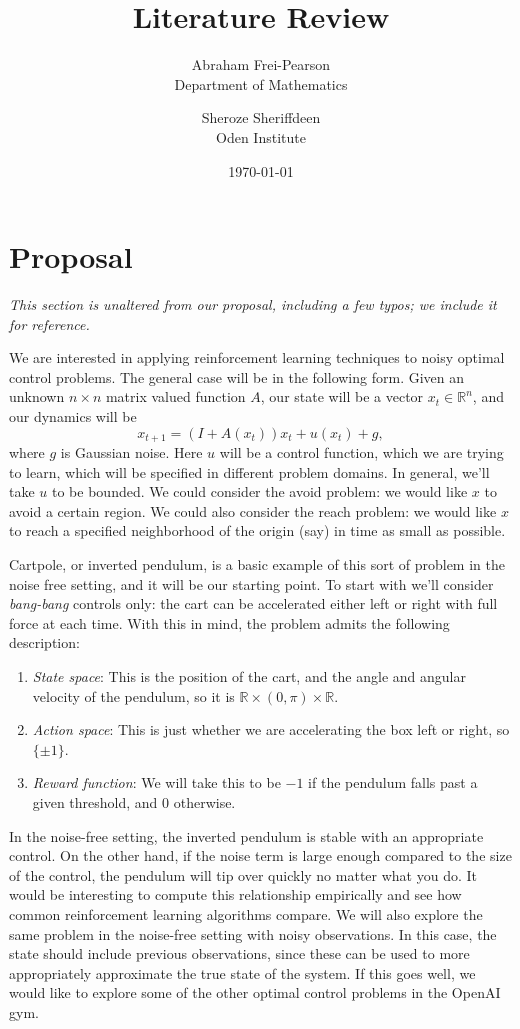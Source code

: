 \documentclass{article}
\title{Literature Review}
\author{Abraham Frei-Pearson \\
	Department of Mathematics  \\
	\and 
	Sheroze Sheriffdeen \\
	Oden Institute \\
	}
\date{\today}
\begin{document}
\maketitle

\section{Proposal}

{\em This section is unaltered from our proposal, including a few typos; we include it for reference.}

We are interested in applying reinforcement learning techniques to noisy optimal control problems. The general case will be in the following form. Given an unknown $n \times n$ matrix valued function $A$, our state will be a vector $x_t \in \mathbb R^n$, and our dynamics will be
\[
    x_{t+1} = (I + A(x_t)) x_t + u(x_t) + g,
\]
where $g$ is Gaussian noise. Here $u$ will be a control function, which we are trying to learn, which will be specified in different problem domains. In general, we'll take $u$ to be bounded. We could consider the avoid problem: we would like $x$ to avoid a certain region. We could also consider the reach problem: we would like $x$ to reach a specified neighborhood of the origin (say) in time as small as possible.

Cartpole, or inverted pendulum, is a basic example of this sort of problem in the noise free setting, and it will be our starting point. To start with we'll consider {\em bang-bang} controls only: the cart can be accelerated either left or right with full force at each time. With this in mind, the problem admits the following description:
\begin{enumerate}
    \item []{\em State space}: This is the position of the cart, and the angle and angular velocity of the pendulum, so it is $\mathbb R \times (0,\pi) \times \mathbb R$.
    \item []{\em Action space}: This is just whether we are accelerating the box left or right, so $\{\pm 1\}$.
    \item []{\em Reward function}: We will take this to be $-1$ if the pendulum falls past a given threshold, and $0$ otherwise.
\end{enumerate}

In the noise-free setting, the inverted pendulum is stable with an appropriate control. On the other hand, if the noise term is large enough compared to the size of the control, the pendulum will tip over quickly no matter what you do. It would be interesting to compute this relationship empirically and see how common reinforcement learning algorithms compare.
We will also explore the same problem in the noise-free setting with noisy observations. In this case, the state should include previous observations, since these can be used to more appropriately approximate the true state of the system.
If this goes well, we would like to explore some of the other optimal control problems in the OpenAI gym.
\end{document}
